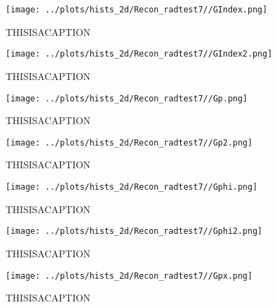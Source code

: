 \documentclass{article}
\begin{document}
\begin{landscape}
    \begin{figure}[ht]
        \centering

        \texttt{[image: ../plots/hists\_2d/Recon\_radtest7//GIndex.png]}
        \captionsetup{textformat=empty,labelformat=blank}
        \caption{THISISACAPTION}
    \end{figure}
    \clearpage
    
    \begin{figure}[ht]
        \centering

        \texttt{[image: ../plots/hists\_2d/Recon\_radtest7//GIndex2.png]}
        \captionsetup{textformat=empty,labelformat=blank}
        \caption{THISISACAPTION}
    \end{figure}
    \clearpage
    
    \begin{figure}[ht]
        \centering

        \texttt{[image: ../plots/hists\_2d/Recon\_radtest7//Gp.png]}
        \captionsetup{textformat=empty,labelformat=blank}
        \caption{THISISACAPTION}
    \end{figure}
    \clearpage
    
    \begin{figure}[ht]
        \centering

        \texttt{[image: ../plots/hists\_2d/Recon\_radtest7//Gp2.png]}
        \captionsetup{textformat=empty,labelformat=blank}
        \caption{THISISACAPTION}
    \end{figure}
    \clearpage
    
    \begin{figure}[ht]
        \centering

        \texttt{[image: ../plots/hists\_2d/Recon\_radtest7//Gphi.png]}
        \captionsetup{textformat=empty,labelformat=blank}
        \caption{THISISACAPTION}
    \end{figure}
    \clearpage
    
    \begin{figure}[ht]
        \centering

        \texttt{[image: ../plots/hists\_2d/Recon\_radtest7//Gphi2.png]}
        \captionsetup{textformat=empty,labelformat=blank}
        \caption{THISISACAPTION}
    \end{figure}
    \clearpage
    
    \begin{figure}[ht]
        \centering

        \texttt{[image: ../plots/hists\_2d/Recon\_radtest7//Gpx.png]}
        \captionsetup{textformat=empty,labelformat=blank}
        \caption{THISISACAPTION}
    \end{figure}
    \clearpage
    

\end{landscape}
\end{document}
